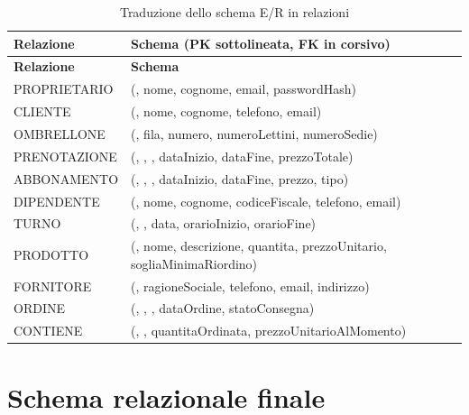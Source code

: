 \begin{longtable}{L{3.5cm} L{10cm}}
  \caption{Traduzione dello schema E/R in relazioni}
  \label{tab:traduzione} \\
  \toprule
  \textbf{Relazione} & \textbf{Schema (PK sottolineata, FK in corsivo)} \\
  \midrule
  \endfirsthead
  \toprule
  \textbf{Relazione} & \textbf{Schema} \\
  \midrule
  \endhead
  \bottomrule
  \endfoot

  PROPRIETARIO   & (, nome, cognome, email, passwordHash) \\[4pt]
  CLIENTE        & (, nome, cognome, telefono, email) \\[4pt]
  OMBRELLONE     & (, fila, numero, numeroLettini, numeroSedie) \\[4pt]
  PRENOTAZIONE   & (, , ,
                   dataInizio, dataFine, prezzoTotale) \\[4pt]
  ABBONAMENTO    & (, , ,
                   dataInizio, dataFine, prezzo, tipo) \\[4pt]
  DIPENDENTE     & (, nome, cognome, codiceFiscale, telefono, email) \\[4pt]
  TURNO          & (, , data,
                   orarioInizio, orarioFine) \\[4pt]
  PRODOTTO       & (, nome, descrizione, quantita, prezzoUnitario,
                   sogliaMinimaRiordino) \\[4pt]
  FORNITORE      & (, ragioneSociale, telefono, email, indirizzo) \\[4pt]
  ORDINE         & (, , ,
                   dataOrdine, statoConsegna) \\[4pt]
  CONTIENE       & (, ,
                   quantitaOrdinata, prezzoUnitarioAlMomento) \\[4pt]
\end{longtable}

\section{Schema relazionale finale}

